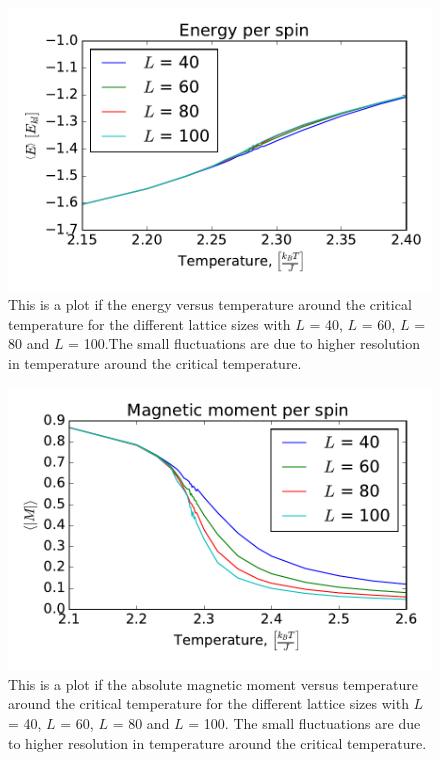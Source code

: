 \begin{figure}[H]
\includegraphics[width=\linewidth]{../results/4e/4e_energy}\caption{This is a plot if the energy versus temperature around the critical temperature for the different lattice sizes with $L$ = 40, $L$ = 60, $L$ = 80 and $L$ = 100.The small fluctuations are due to higher resolution in temperature around the critical temperature.}\label{fig:4e_energy}
\end{figure}

\begin{figure}[H]
\includegraphics[width=\linewidth]{../results/4e/4e_mag}\caption{This is a plot if the absolute magnetic moment versus temperature around the critical temperature for the different lattice sizes with $L$ = 40, $L$ = 60, $L$ = 80 and $L$ = 100. The small fluctuations are due to higher resolution in temperature around the critical temperature.}\label{fig:4e_magnetic}
\end{figure}


